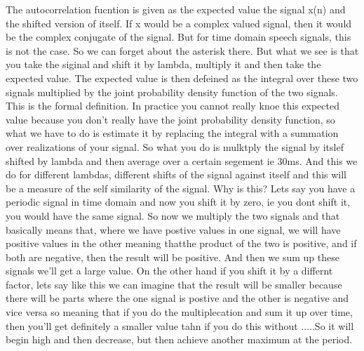 The autocorrelation fucntion is given as the expected value the signal x(n) and the shifted version of itself.  If x would be a complex valued signal, then it would be the complex conjugate of the signal. But for time domain speech signals, this is not the case. So we can forget about the asterisk there. But what we see is that you take the siginal and shift it by lambda, multiply it and then take the expected value.  The expected value is then defeined as the integral over these two signals multiplied by the joint probability density function of the two signals. This is the formal definition. In practice you cannot really knoe this expected value because you don't really have the joint probability density function, so what we have to do is estimate it by replacing the integral with a summation over realizations of your signal. So what you do is mulktply the signal by itslef shifted by lambda and then average over a certain segement ie 30ms. And this we do for different lambdas, different shifts of the signal against itself and this will be a measure of the self similarity of the signal. Why is this? Lets say you have a periodic signal in time domain and now you shift it by zero, ie you dont shift it, you would have the same signal. So now we multiply the two signals and that basically means that, where we have postive values in one signal, we will have positive values in the other meaning thatthe product of the two is positive, and if both are negative, then the result will be positive.  And then we sum up these signals we'll get a large value.  On the other hand if you shift it by a differnt factor, lets say like this we can imagine that the result will be smaller because there will be parts where the one signal is postive and the other is negative and vice versa so meaning that if you do the multiplecation and sum it up over time, then you'll get definitely a smaller value tahn if you do this without .....So it will begin high and then decrease, but then achieve another maximum at the period.  

